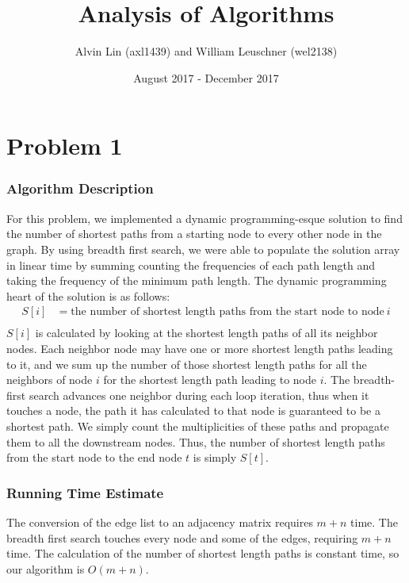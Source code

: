 \documentclass{math}
\title{Analysis of Algorithms}
\author{Alvin Lin (axl1439) and William Leuschner (wel2138)}
\date{August 2017 - December 2017}
\begin{document}
\maketitle

\section*{Problem 1}

\subsubsection*{Algorithm Description}
For this problem, we implemented a dynamic programming-esque solution to find
the number of shortest paths from a starting node to every other node in the
graph. By using breadth first search, we were able to populate the solution
array in linear time by summing counting the frequencies of each path length
and taking the frequency of the minimum path length. The dynamic programming
heart of the solution is as follows:
\begin{align*}
  S[i] &= \text{the number of shortest length paths from the start node to node}
    ~i \\
\end{align*}
\( S[i] \) is calculated by looking at the shortest length paths of all its
neighbor nodes. Each neighbor node may have one or more shortest length paths
leading to it, and we sum up the number of those shortest length paths for all
the neighbors of node \( i \) for the shortest length path leading to node
\( i \). The breadth-first search advances one neighbor during each loop
iteration, thus when it touches a node, the path it has calculated to that node
is guaranteed to be a shortest path. We simply count the multiplicities of
these paths and propagate them to all the downstream nodes. Thus, the number of
shortest length paths from the start node to the end node \( t \) is simply
\( S[t] \).

\subsubsection*{Running Time Estimate}
The conversion of the edge list to an adjacency matrix requires \( m+n \) time.
The breadth first search touches every node and some of the edges, requiring
\( m+n \) time. The calculation of the number of shortest length paths is
constant time, so our algorithm is \( O(m+n) \).
\end{document}
